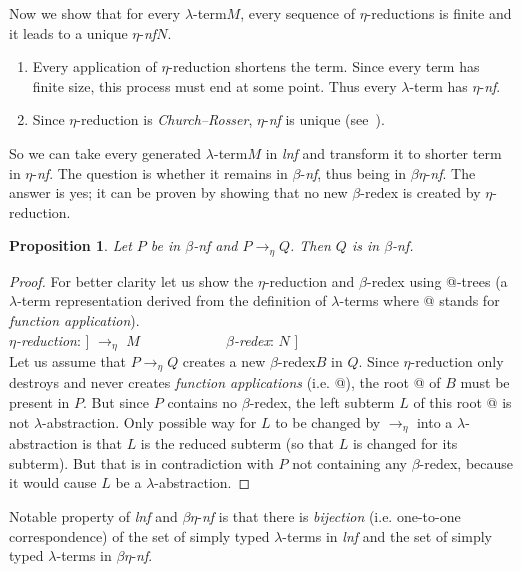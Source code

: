 \documentclass{sig-alternate}
\makeatletter
\newtheorem{proposition}{Proposition}
\newcommand{\Lets}{Let us\xspace}
\newcommand{\lets}{let us\xspace}
\newcommand{\lterm}{$\lambda$-term\xspace}
\newcommand{\lterms}{$\lambda$-terms\xspace}
\newcommand{\atTree}{@-tree\xspace}
\newcommand{\lh}[1]{\lambda #1}
\newcommand{\ered}{$\eta$-reduction\xspace}
\newcommand{\bnf}{$\beta$-\textit{nf}\xspace}
\newcommand{\enf}{$\eta$-\textit{nf}\xspace}
\newcommand{\benf}{$\beta\eta$-\textit{nf}\xspace}
\newcommand{\bredex}{$\beta$-redex\xspace}
\newcommand{\lnf}{\textit{lnf}\xspace}
\newcommand{\eArrow}{\rightarrow_\eta\xspace}
\makeatother
\begin{document}
Now we show that for every \lterm $M$, 
every sequence of $\eta$-reductions is finite and
it leads to a unique \enf $N$.

\begin{enumerate}
 \item Every application of \ered shortens the term.
       Since every term has finite size, this process must 
       end at some point. Thus every \lterm has \enf.
 \item Since \ered is \textit{Church–Rosser}, \enf is unique (see~\cite{barendregt84}). 
\end{enumerate}

So we can take every generated \lterm $M$ in 
\lnf and transform it to shorter term in \enf. 
The question is whether it remains in \bnf, thus being in \benf.
The answer is yes; it can be proven by showing that no 
new \bredex is created by \ered.  

\begin{proposition}
Let $P$ be in \bnf and $P \eArrow Q$. Then $Q$ is in \bnf.    
\end{proposition}
\begin{proof}

For better clarity \lets show the \ered and \bredex using \atTree{}s 
(a \lterm representation derived from the definition of \lterms 
where @ stands for \textit{function application}).\\
\textit{\ered}: \Tree [.$\lh{x}$ [.@ $M$ $x$ ] ] 
$\eArrow$
$M$ 
~~~~~~~~~~~
\textit{\bredex}: \Tree [.@ [.$\lh{x}$ $M$ ] $N$ ] \\

\Lets assume that $P \eArrow Q$ creates a new \bredex $B$ in $Q$.
Since \ered only destroys and never creates \textit{function applications} (i.e. @),
the root @ of $B$ must be present in $P$.  
But since $P$ contains no \bredex, the left subterm $L$ of this root @
is not $\lambda$-abstraction.
Only possible way for $L$ to be changed by $\eArrow$ into 
a $\lambda$-abstraction is that $L$ is the reduced subterm (so that
$L$ is changed for its subterm).
But that is in contradiction with $P$ not containing any \bredex,
because it would cause $L$ be a $\lambda$-abstraction.
\end{proof}

Notable property of \lnf and \benf is that there is \textit{bijection} 
(i.e. one-to-one correspondence) of 
the set of simply typed \lterms in \lnf and 
the set of simply typed \lterms in \benf.
\end{document}
